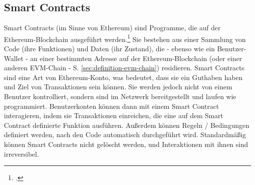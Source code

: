 \subsection{Smart Contracts}
\label{sec:definition-smart-contracts}
Smart Contracts (im Sinne von Ethereum) sind Programme, die auf der Ethereum-Blockchain ausgeführt werden.\footcite[Vgl. hierzu und zum Folgenden][]{w4} 
Sie bestehen aus einer Sammlung von Code (ihre Funktionen) und Daten (ihr Zustand), die - ebenso wie ein Benutzer-Wallet - an einer bestimmten Adresse auf der Ethereum-Blockchain (oder einer anderen EVM-Chain - S. \ref{sec:definition-evm-chain}) residieren.
Smart Contracts sind eine Art von Ethereum-Konto, was bedeutet, dass sie ein Guthaben haben und Ziel von Transaktionen sein können. 
Sie werden jedoch nicht von einem Benutzer kontrolliert, sondern sind im Netzwerk bereitgestellt und laufen wie programmiert. 
Benutzerkonten können dann mit einem Smart Contract interagieren, indem sie Transaktionen einreichen, die eine auf dem Smart Contract definierte Funktion ausführen. 
Außerdem können Regeln / Bedingungen definiert werden, nach den Code automatisch durchgeführt wird.
Standardmäßig können Smart Contracts nicht gelöscht werden, und Interaktionen mit ihnen sind irreversibel.